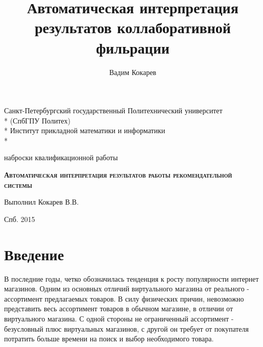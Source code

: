 \documentclass[12pt,a4paper]{report}
\author{Вадим Кокарев}
\title{Автоматическая интерпретация результатов коллаборативной фильрации}
\begin{document}
\begin{titlepage}
\newpage
\begin{center}
\vspace{1cm}
Санкт-Петербургский государственный Политехнический университет  \\*
(СпбГПУ Политех) \\*
Институт прикладной математики и информатики \\*
\hrulefill
\end{center}
 

\vspace{8em}

\begin{center}
\Large наброски квалификационной работы
\end{center}

\vspace{2.5em}
 
\begin{center}
\textsc{\textbf{Автоматическая интерпретация результатов работы рекомендательной системы}}
\end{center}

\vspace{6em}
 
\begin{flushleft}
Выполнил \hrulefill Кокарев В.В. \\
\vspace{1.5em}
\end{flushleft}
 
\vspace{\fill}

\begin{center}
Спб. 2015
\end{center}

\end{titlepage}
\tableofcontents %
\pagebreak
\chapter{Введение}
В последние годы, четко обозначилась тенденция к росту популярности интернет магазинов. Одним из основных отличий виртуального магазина от реального - ассортимент предлагаемых товаров. В силу физических причин, невозможно представить весь ассортимент товаров в обычном магазине, в отличии от виртуального магазина. С одной стороны не ограниченный ассортимент - безусловный плюс виртуальных магазинов, с другой он требует от покупателя потратить больше времени на поиск и выбор необходимого товара.
\end{document}
